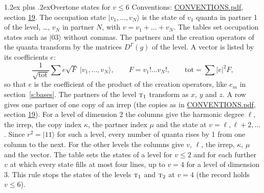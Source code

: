 \documentclass[10pt,a4paper]{article}
\makeatletter
\renewcommand\section{\@startsection{section}{1}{\z@}{-3ex plus -1ex minus -.2ex}%
  {1.2ex plus .2ex}{\normalfont\large\sffamily\bfseries\color{parttitle}}}
\numberwithin{equation}{section}
\newcommand{\irr}[1]{\text{\normalfont\scshape #1}}
\newcommand{\repD}[1]{D^{#1}}
\newcommand{\mult}{\kappa}
\newcommand{\intx}{\mu}
\newcommand{\occ}[1]{\lvert #1\rangle}
\makeatother
\begin{document}
\section{Overtone states for \texorpdfstring{$v \le 6$}{v \textleq\ 6}}\label{s:overtone_states}
Conventions: \href{../../CONVENTIONS.pdf}{CONVENTIONS.pdf}, section \href{../../CONVENTIONS.pdf\#conv.19}{19}.
\leavevmode\label{n:vector.occupation}\label{n:local.quanta.partner}\label{n:local.weight.occupation}The occupation state $\occ{v_1, \dots, v_N}$ is the state of $v_1$ quanta in partner 1 of the level, \dots, $v_N$ in partner $N$, with $v = v_1 + \dots + v_N$. The tables set occupation states such as $\occ{03}$ without commas. The partners and the creation operators of the quanta transform by the matrices $\repD{\Gamma}(g)$ of the level. A vector is listed by its coefficients $e$:
\begin{equation}\label{e:occupation}\frac{1}{\sqrt{\mathrm{tot}}}\sum e\sqrt{F}\;\occ{v_1, \dots, v_N},\qquad F = v_1!\dots v_N!,\qquad \mathrm{tot} = \sum |e|^2F,\end{equation}
so that $e$ is the coefficient of the product of the creation operators, like $e_m$ in section~\ref{s:bases}. The partners of the level $\irr{t}_{1}$ transform as $x$, $y$ and $z$. A row gives one partner of one copy of an irrep (the copies as in \href{../../CONVENTIONS.pdf}{CONVENTIONS.pdf}, section \href{../../CONVENTIONS.pdf\#conv.19}{19}). For a level of dimension 2 the columns give the harmonic degree $\ell$, the irrep, the copy index $\mult$, the partner index $\intx$ and the state at $v = \ell, \ell + 2, \dots$. Since $r^2 = \occ{11}$ for such a level, every number of quanta rises by 1 from one column to the next. For the other levels the columns give $v$, $\ell$, the irrep, $\mult$, $\intx$ and the vector.
The table sets the states of a level for $v \le 2$ and for each further $v$ at which every state fills at most four lines, up to $v = 4$ for a level of dimension 3. This rule stops the states of the levels $\irr{t}_{1}$ and $\irr{t}_{2}$ at $v = 4$ (the record holds $v \le 6$).
\end{document}

